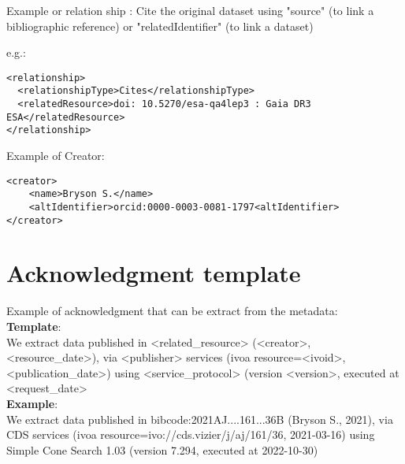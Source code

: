 \documentclass[11pt,a4paper]{ivoa}
\begin{document}
Example or relation ship :
Cite the original dataset using "source" (to link a bibliographic reference) or "relatedIdentifier" (to link a dataset)

e.g.:
\begin{verbatim}
<relationship>
  <relationshipType>Cites</relationshipType>
  <relatedResource>doi: 10.5270/esa-qa4lep3 : Gaia DR3 ESA</relatedResource>
</relationship>
\end{verbatim}

Example of Creator:
\begin{verbatim}
<creator>
	<name>Bryson S.</name>
	<altIdentifier>orcid:0000-0003-0081-1797<altIdentifier>
</creator>
\end{verbatim}

%

\section{Acknowledgment template}

Example of acknowledgment that can be extract from the metadata:\\

\textbf{Template}:\\
We extract data published in <related\_resource> (<creator>, <resource\_date>),
via <publisher> services (ivoa resource=<ivoid>, <publication\_date>)
using <service\_protocol> (version <version>, executed at <request\_date>\\


\textbf{Example}:\\
We extract data published in bibcode:2021AJ....161...36B (Bryson S., 2021),
via CDS services (ivoa resource=ivo://cds.vizier/j/aj/161/36, 2021-03-16)
using Simple Cone Search 1.03 (version 7.294, executed at 2022-10-30)



\appendix
\end{document}
